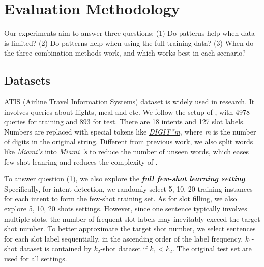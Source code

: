 \section{Evaluation Methodology}
Our experiments aim to answer three questions: (1) Do \RE patterns help when data is limited? (2) Do \RE patterns help when using the full training data? (3) When do the three combination methods work, and which works best in each scenario?

\subsection{Datasets}
\label{sec_datasest}
ATIS (Airline Travel Information Systems) dataset \cite{hemphill1990atis} is widely used in \NLU research. It involves queries about flights, meal and etc. We follow the setup of \cite{liu2016attention}, with 4978 queries for training and 893 for test. There are 18 intents and 127 slot labels. Numbers are replaced with special tokens like \textsl{\underline{DIGIT*m}}, where \emph{m} is the number of digits in the original string. Different from previous work, we also split words like \textsl{\underline{Miami's}} into \textsl{\underline{Miami 's}} to reduce the number of unseen words, which eases few-shot leanring and reduces the complexity of \RE.

To answer question (1), we also explore the \textbf{\emph{full few-shot learning setting}}. Specifically, for intent detection, we randomly select 5, 10, 20 training instances for each intent to form the few-shot training set. 
As for slot filling, we also explore 5, 10, 20 shots settings. 
However, since one sentence typically involves multiple slots, the number of frequent slot labels may inevitably exceed the target shot number. To better approximate the target shot number, we select sentences for each slot label sequentially, in the ascending order of the label frequency.
$k_1$-shot dataset is contained by $k_2$-shot dataset if $k_1 < k_2$. 
The original test set are used for all settings.

